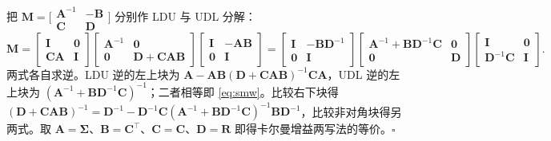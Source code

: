 \begin{derivation}
把 $\mathbf{M}=\big[\begin{smallmatrix}\mathbf{A}^{-1}&-\mathbf{B}\\\mathbf{C}&\mathbf{D}\end{smallmatrix}\big]$ 分别作 LDU 与 UDL 分解：
\[
  \mathbf{M}=\begin{bmatrix}\mathbf{I}&\mathbf{0}\\\mathbf{C}\mathbf{A}&\mathbf{I}\end{bmatrix}
  \begin{bmatrix}\mathbf{A}^{-1}&\mathbf{0}\\\mathbf{0}&\mathbf{D}+\mathbf{C}\mathbf{A}\mathbf{B}\end{bmatrix}
  \begin{bmatrix}\mathbf{I}&-\mathbf{A}\mathbf{B}\\\mathbf{0}&\mathbf{I}\end{bmatrix}
  =\begin{bmatrix}\mathbf{I}&-\mathbf{B}\mathbf{D}^{-1}\\\mathbf{0}&\mathbf{I}\end{bmatrix}
  \begin{bmatrix}\mathbf{A}^{-1}+\mathbf{B}\mathbf{D}^{-1}\mathbf{C}&\mathbf{0}\\\mathbf{0}&\mathbf{D}\end{bmatrix}
  \begin{bmatrix}\mathbf{I}&\mathbf{0}\\\mathbf{D}^{-1}\mathbf{C}&\mathbf{I}\end{bmatrix}.
\]
两式各自求逆。LDU 逆的左上块为 $\mathbf{A}-\mathbf{A}\mathbf{B}(\mathbf{D}+\mathbf{C}\mathbf{A}\mathbf{B})^{-1}\mathbf{C}\mathbf{A}$，UDL 逆的左上块为 $(\mathbf{A}^{-1}+\mathbf{B}\mathbf{D}^{-1}\mathbf{C})^{-1}$；二者相等即 \cref{eq:smw}。比较右下块得 $(\mathbf{D}+\mathbf{C}\mathbf{A}\mathbf{B})^{-1}=\mathbf{D}^{-1}-\mathbf{D}^{-1}\mathbf{C}(\mathbf{A}^{-1}+\mathbf{B}\mathbf{D}^{-1}\mathbf{C})^{-1}\mathbf{B}\mathbf{D}^{-1}$，比较非对角块得另两式。取 $\mathbf{A}=\boldsymbol{\Sigma}$、$\mathbf{B}=\mathbf{C}^\top$、$\mathbf{C}=\mathbf{C}$、$\mathbf{D}=\mathbf{R}$ 即得卡尔曼增益两写法的等价。\hfill$\square$
\end{derivation}

